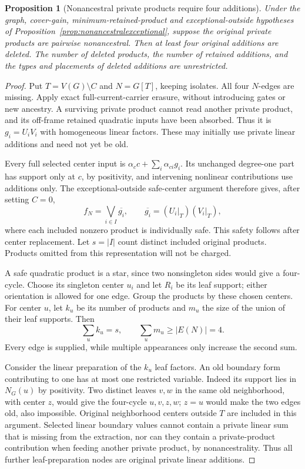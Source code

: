 \documentclass[11pt]{article}
\newtheorem{proposition}[theorem]{Proposition}
\theoremstyle{definition}
\theoremstyle{remark}
\begin{document}
\begin{proposition}[Nonancestral private products require four additions]\label{prop:nonancestraladditions}
Under the graph, cover-gain, minimum-retained-product and exceptional-outside hypotheses of Proposition~\ref{prop:nonancestralexceptional}, suppose the original private products are pairwise nonancestral. Then at least four original additions are deleted. The number of deleted products, the number of retained additions, and the types and placements of deleted additions are unrestricted.
\end{proposition}
\begin{proof}
Put $T=V(G)\setminus C$ and $N=G[T]$, keeping isolates. All four $N$-edges are missing. Apply exact full-current-carrier erasure, without introducing gates or new ancestry. A surviving private product cannot read another private product, and its off-frame retained quadratic inputs have been absorbed. Thus it is $g_i=U_iV_i$ with homogeneous linear factors. These may initially use private linear additions and need not yet be old.

Every full selected center input is $\alpha_c c+\sum_i\alpha_{ci}g_i$. Its unchanged degree-one part has support only at $c$, by positivity, and intervening nonlinear contributions use additions only. The exceptional-outside safe-center argument therefore gives, after setting $C=0$,
\[
 f_N=\bigvee_{i\in I}\overline{g_i},
 \qquad\overline{g_i}=(U_i|_T)(V_i|_T),
\]
where each included nonzero product is individually safe. This safety follows after center replacement. Let $s=|I|$ count distinct included original products. Products omitted from this representation will not be charged.

A safe quadratic product is a star, since two nonsingleton sides would give a four-cycle. Choose its singleton center $u_i$ and let $R_i$ be its leaf support; either orientation is allowed for one edge. Group the products by these chosen centers. For center $u$, let $k_u$ be its number of products and $m_u$ the size of the union of their leaf supports. Then
\[
 \sum_u k_u=s,\qquad \sum_u m_u\ge |E(N)|=4.          \tag{a}
\]
Every edge is supplied, while multiple appearances only increase the second sum.

Consider the linear preparation of the $k_u$ leaf factors. An old boundary form contributing to one has at most one restricted variable. Indeed its support lies in $N_G(u)$ by positivity. Two distinct leaves $v,w$ in the same old neighborhood, with center $z$, would give the four-cycle $u,v,z,w$; $z=u$ would make the two edges old, also impossible. Original neighborhood centers outside $T$ are included in this argument. Selected linear boundary values cannot contain a private linear sum that is missing from the extraction, nor can they contain a private-product contribution when feeding another private product, by nonancestrality. Thus all further leaf-preparation nodes are original private linear additions.


\end{proof}
\end{document}

